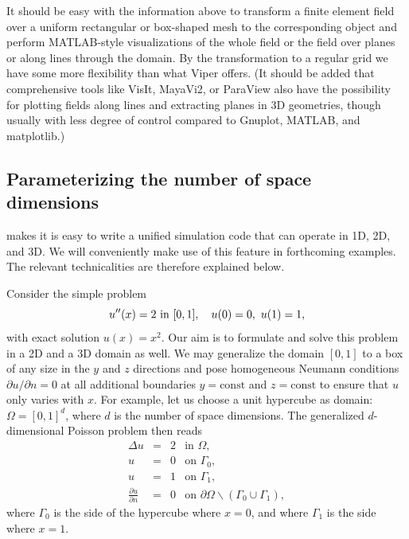 It should be easy with the information above to transform a finite element
field over a uniform rectangular or box-shaped mesh to the corresponding
 object and perform MATLAB-style
visualizations of the whole field or
the field over planes or along lines through the domain.
By the transformation to a regular grid we have some more flexibility
than what Viper offers. (It should be added that
comprehensive tools like
VisIt, MayaVi2, or ParaView also have the possibility for plotting fields
along lines and extracting planes in 3D geometries, though usually with
less degree of control compared to Gnuplot, MATLAB, and matplotlib.)

\subsection{Parameterizing the number of space dimensions}
\label{langtangen:poisson:nD}

\fenics{} makes it is easy to write a unified simulation code that can operate
in 1D, 2D, and 3D. We will conveniently make use of this feature in
forthcoming examples. The relevant technicalities are therefore explained
below.

Consider the simple problem
\begin{equation}
u''(x) = 2\hbox{ in }[0,1],\quad u(0)=0,\ u(1)=1,
\end{equation}
with exact solution $u(x)=x^2$. Our aim is to formulate and solve this
problem in a 2D and a 3D domain as well.
We may generalize the domain $[0,1]$ to a box of any size
in the $y$ and $z$ directions and pose homogeneous Neumann
conditions $\partial u/\partial n = 0$ at all additional boundaries
$y=\mbox{const}$ and $z=\mbox{const}$ to ensure that $u$ only varies with
$x$. For example, let us choose
a unit hypercube as domain: $\Omega = [0,1]^d$, where $d$ is the number
of space dimensions. The generalized $d$-dimensional Poisson problem
then reads
\begin{equation} \label{langtangen:poisson1:ddim}
  \begin{array}{rcll}
    \Delta u &=& 2 &\mbox{in } \Omega, \\
    u &=& 0 &\mbox{on } \Gamma_0,\\
    u &=& 1 &\mbox{on } \Gamma_1,\\
\frac{\partial u}{\partial n} &=& 0 &\mbox{on } \partial\Omega\backslash\left(
\Gamma_0\cup\Gamma_1\right),
  \end{array}
\end{equation}
where $\Gamma_0$ is the side of the hypercube where $x=0$, and
where $\Gamma_1$ is the side where $x=1$.

